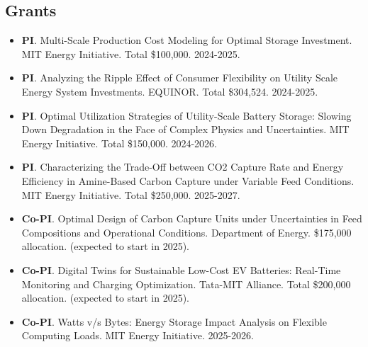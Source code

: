 \documentclass[letterpaper, 11pt]{article}
\begin{document}
\subsection*{Grants}
\begin{itemize}[itemsep=1pt, parsep=0pt,leftmargin=*]
\item[] \textbf{PI}. Multi-Scale Production Cost Modeling for Optimal Storage Investment. MIT Energy Initiative. Total \$100,000. 2024-2025.
\item[] \textbf{PI}. Analyzing the Ripple Effect of Consumer Flexibility on Utility Scale Energy System Investments. EQUINOR. Total \$304,524. 2024-2025.
\item[] \textbf{PI}. Optimal Utilization Strategies of Utility-Scale Battery Storage: Slowing Down Degradation in the Face of Complex Physics and Uncertainties. MIT Energy Initiative. Total \$150,000. 2024-2026.
\item[] \textbf{PI}. Characterizing the Trade-Off between CO2 Capture Rate and Energy Efficiency in Amine-Based Carbon Capture under Variable Feed Conditions. MIT Energy Initiative. Total \$250,000. 2025-2027.
\item[] \textbf{Co-PI}. Optimal Design of Carbon Capture Units under Uncertainties in Feed
Compositions and Operational Conditions. Department of Energy. \$175,000 allocation. (expected to start in 2025). 
\item[] \textbf{Co-PI}. Digital Twins for Sustainable Low-Cost EV Batteries: Real-Time Monitoring and Charging Optimization. Tata-MIT Alliance. Total \$200,000 allocation. (expected to start in 2025).
\item[] \textbf{Co-PI}. Watts v/s Bytes: Energy Storage Impact Analysis on Flexible Computing Loads. MIT Energy Initiative. 2025-2026.
\end{itemize}

\end{document}
